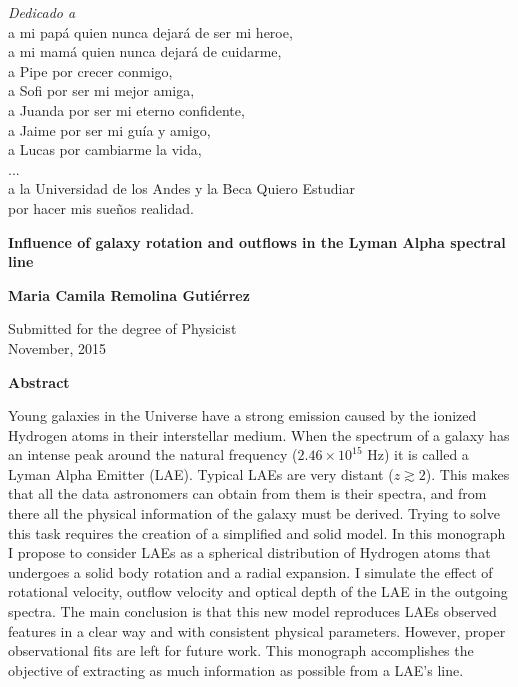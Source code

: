 \newpage
\thispagestyle{empty}
\begin{center}
\vspace*{2cm}
\textit{\LARGE {Dedicado a}}\\ 
a mi pap\'a quien nunca dejar\'a de ser mi heroe, \\ 
a mi mam\'a quien nunca dejar\'a de cuidarme, \\
a Pipe por crecer conmigo, \\
a Sofi por ser mi mejor amiga, \\ 
a Juanda por ser mi eterno confidente, \\ 
a Jaime por ser mi gu\'ia y amigo, \\
a Lucas por cambiarme la vida, \\
...\\
a la Universidad de los Andes y la Beca Quiero Estudiar\\por hacer mis sue\~nos realidad. \\

\end{center}

\newpage
\thispagestyle{empty}
\begin{center}
  \textbf{\Large Influence of galaxy rotation and outflows in the Lyman Alpha spectral line}

  \vspace*{1cm}
  \textbf{\large Maria Camila Remolina Guti\'errez}

  \vspace*{0.5cm}
  {\large Submitted for the degree of Physicist\\ November, 2015}

  \vspace*{1cm}
  \textbf{\large Abstract}
\end{center}
Young galaxies in the Universe have a strong \lya emission caused by the ionized Hydrogen atoms in their interstellar medium. When the spectrum of a galaxy has an intense peak around the \lya natural frequency ($2.46\times 10^{15}$ Hz) it is called a Lyman Alpha Emitter (LAE). Typical LAEs are very distant ($z \gtrsim 2$). This makes that all the data astronomers can obtain from them is their spectra, and from there all the physical information of the galaxy must be derived. Trying to solve this task requires the creation of a simplified and solid model. In this monograph I propose to consider LAEs as a spherical distribution of Hydrogen atoms that undergoes a solid body rotation and a radial expansion. I simulate the effect of rotational velocity, outflow velocity and optical depth of the LAE in the outgoing spectra. The main conclusion is that this new model reproduces LAEs observed features in a clear way and with consistent physical parameters. However, proper observational fits are left for future work. This monograph accomplishes the objective of extracting as much information as possible from a LAE's \lya line.\\ 

